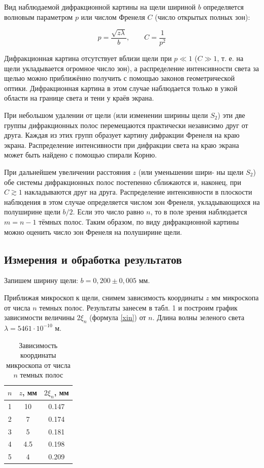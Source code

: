Вид наблюдаемой дифракционной картины
на щели шириной $ b $ определяется волновым параметром $ p $ или числом Френеля $ C $ (число открытых полных зон):


\begin{equation}\label{}
p = \dfrac{\sqrt{z \lambda}}{b}, \qquad C = \dfrac{1}{p^2}
\end{equation}

Дифракционная картина отсутствует вблизи щели при $ p \ll 1 $
($ C \gg 1 $, т. е. на щели укладывается огромное число зон), а распределение интенсивности света за щелью можно приближённо получить
с помощью законов геометрической оптики. Дифракционная картина
в этом случае наблюдается только в узкой области на границе света и
тени у краёв экрана.

При небольшом удалении от щели (или изменении ширины щели $ S_2 $) эти две группы дифракционных полос перемещаются практически независимо друг от друга. Каждая из этих групп образует картину дифракции Френеля на краю экрана. Распределение интенсивности
при дифракции света на краю экрана может быть найдено с помощью
спирали Корню.

При дальнейшем увеличении расстояния $ z $ (или уменьшении шири-
ны щели $ S_2 $) обе системы дифракционных полос постепенно сближаются и, наконец, при $ C \gtrsim 1 $ накладываются друг на друга. Распределение интенсивности в плоскости наблюдения в этом случае определяется
числом зон Френеля, укладывающихся на полуширине щели $ b/2 $. Если это число равно $ n $, то в поле зрения наблюдается $ m = n - 1 $ тёмных полос. Таким образом, по виду дифракционной картины можно оценить
число зон Френеля на полуширине щели.

\subsection{Измерения и обработка результатов}

Запишем ширину щели: $ b = 0,200 \pm 0,005 $ мм. 

Приближая микроскоп к щели, снимем зависимость координаты $z $ мм микроскопа от числа $ n $ темных полос.
\newline
Результаты занесем в табл. 1 и построим график зависимости величины $ 2\xi_n $ (формула \eqref{xin}) от $ n $. Длина волны зеленого света $ \lambda = 5461 \cdot 10^{-10} $ м. 

\begin{table}[h!]
\caption{Зависимость координаты микроскопа от числа $ n $ темных полос}
\begin{center}
	\begin{tabular}{|c|c|c|}
		\hline
		$ n $ & $ z $, мм & $ 2\xi_n $, мм\\
		\hline
		1 & 10 & 0.147 \\
	    \hline
		2 & 7 & 0.174 \\
		\hline
		3 & 5 & 0.181 \\
		\hline
		4 & 4.5 & 0.198 \\
		\hline
		5 & 4 & 0.209 \\
		\hline
	\end{tabular}
\end{center}
\label{}
\end{table}

